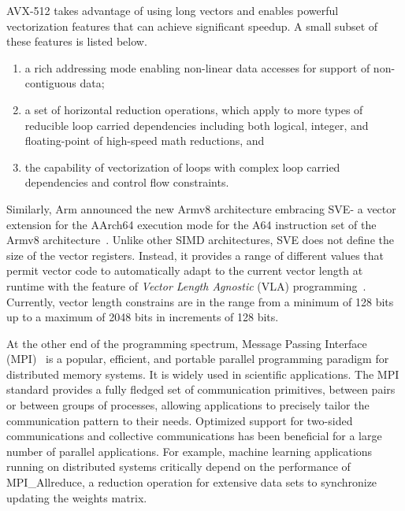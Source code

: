 \documentclass[5p,times,twocolumn]{elsarticle}
\newcommand{\mpi}[0]{\textsc{MPI}\xspace}
\newcommand{\arm}[0]{Arm\xspace}
\newcommand{\sve}[0]{\textsc{SVE}\xspace}
\begin{document}
AVX-512 takes advantage of using long vectors and enables powerful
vectorization features that can achieve significant speedup. A small subset of these features is listed below.
\begin{enumerate}
  \item a rich addressing mode enabling non-linear data accesses for support of non-contiguous data;
  \item a set of horizontal reduction operations, which apply to more
  types of reducible loop carried dependencies including both logical, integer,
  and floating-point of high-speed math reductions, and
  \item the capability of vectorization of loops with complex loop carried dependencies and control flow constraints.
\end{enumerate}

Similarly, \arm announced the new Armv8 architecture embracing \sve - a vector extension for the AArch64
execution mode for the A64 instruction set of the
Armv8 architecture~\cite{arm-v8-ref, ARMv8-Architecture}.
Unlike other SIMD architectures, \sve does not define the size of
the vector registers. Instead, it provides a range of different values that permit vector
code to automatically adapt to the current vector length at runtime with the
feature of \emph{Vector Length Agnostic} (VLA) programming~\cite{Advanced-SIMD,vla-stencil}.
Currently, vector length constrains are in the range from a minimum of 128 bits up to
a maximum of 2048 bits in increments of 128 bits.

At the other end of the programming spectrum, Message Passing Interface
(\mpi)~\cite{mpi-forum} is a popular, efficient, and portable parallel programming
paradigm for distributed memory systems. It is widely used in scientific applications.
The MPI standard provides a fully fledged set of communication primitives, between pairs or between groups of processes,
allowing applications to precisely tailor the communication pattern to their needs.
Optimized support for two-sided communications and
collective communications has been beneficial for a large number of parallel applications. %
For example, machine learning applications running on distributed systems
critically depend on the performance of  MPI\_Allreduce, a reduction operation
for extensive data sets to synchronize updating the weights matrix.
\end{document}
